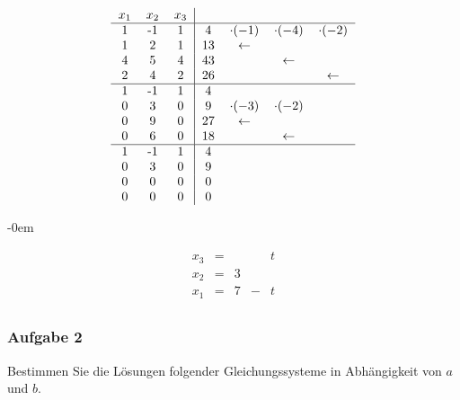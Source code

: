 \begin{enumerate}
					\[
						\begin{tabular} {ccc|ccccc}
							$x_1$ & $x_2$ & $x_3$ & & & & \\
							\hline
							1 & -1 & 1 & 4 & $\cdot(-1)$ & $\cdot(-4)$ & $\cdot(-2)$ \\
							1 & 2 & 1 & 13 & $\leftarrow$ & & \\
							4 & 5 & 4 & 43 & & $\leftarrow$ & \\
							2 & 4 & 2 & 26 & & & $\leftarrow$ \\
							\hline
							1 & -1 & 1 & 4 & & & \\
							0 & 3 & 0 & 9 & $\cdot(-3)$ & $\cdot(-2)$ & \\
							0 & 9 & 0 & 27 & $\leftarrow$ & & \\
							0 & 6 & 0 & 18 & & $\leftarrow$ & \\
							\hline
							1 & -1 & 1 & 4 & & & \\
							0 & 3 & 0 & 9 & & & \\
							0 & 0 & 0 & 0 & & & \\
							0 & 0 & 0 & 0 & & & \\
						\end{tabular}
					\]
					
					\abovedisplayskip-0em
					
					\[
						\begin{array} {ccccc}
							x_3 & = & & & t\\
							x_2 & = & 3 & & \\
							x_1 & = & 7 & - & t \\
						\end{array}
					\]

				\end{enumerate}
	
		\subsubsection{Aufgabe 2}
				
			Bestimmen Sie die L\"osungen folgender Gleichungssysteme in Abh\"angigkeit von $a$ und $b$.

